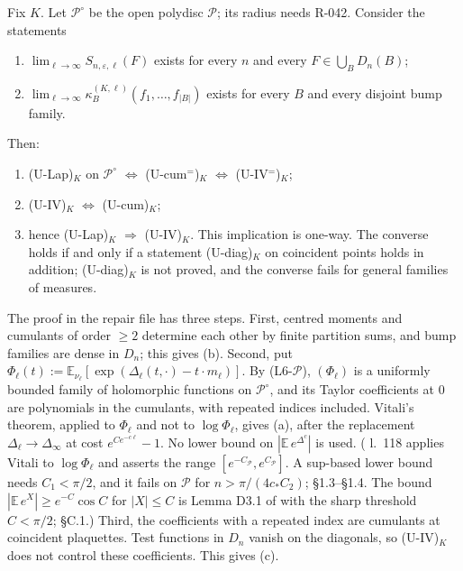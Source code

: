 \begin{theorem}\label{thm:open-U1}
Fix $K$. Let $\mathcal P^\circ$ be the open polydisc $\mathcal P$; its radius needs R-042. Consider the statements
\begin{enumerate}
\item[(U-IV)$_K$] $\lim_{\ell\to\infty}S_{n,\varepsilon,\ell}(F)$ exists for every $n$ and every $F\in\bigcup_BD_n(B)$;
\item[(U-cum)$_K$] $\lim_{\ell\to\infty}\kappa_B^{(K,\ell)}(f_1,\dots,f_{|B|})$ exists for every $B$ and every disjoint bump family.
\end{enumerate}
Then:
\begin{enumerate}
\item[(a)] (U-Lap)$_K$ on $\mathcal P^\circ$ $\Leftrightarrow$ (U-cum$^=$)$_K$ $\Leftrightarrow$ (U-IV$^=$)$_K$;
\item[(b)] (U-IV)$_K$ $\Leftrightarrow$ (U-cum)$_K$;
\item[(c)] hence (U-Lap)$_K$ $\Rightarrow$ (U-IV)$_K$. This implication is one-way. The converse holds if and only if a statement (U-diag)$_K$ on coincident points holds in addition; (U-diag)$_K$ is not proved, and the converse fails for general families of measures.
\end{enumerate}
\end{theorem}

The proof in the repair file has three steps. First, centred moments and cumulants of order $\ge2$ determine each other by finite partition sums, and bump families are dense in $D_n$; this gives (b). Second, put $\Phi_\ell(t):=\mathbb E_{\nu_\ell}[\exp(\Delta_\ell(t,\cdot)-t\cdot m_\ell)]$. By (L6-$\mathcal P$), $(\Phi_\ell)$ is a uniformly bounded family of holomorphic functions on $\mathcal P^\circ$, and its Taylor coefficients at $0$ are polynomials in the cumulants, with repeated indices included. Vitali's theorem, applied to $\Phi_\ell$ and not to $\log\Phi_\ell$, gives (a), after the replacement $\Delta_\ell\to\Delta_\infty$ at cost $e^{Ce^{-c\ell}}-1$. No lower bound on $|\mathbb E\,e^{\Delta^c}|$ is used. ( l.~118 applies Vitali to $\log\Phi_\ell$ and asserts the range $[e^{-C_{\mathcal P}},e^{C_{\mathcal P}}]$. A sup-based lower bound needs $C_1<\pi/2$, and it fails on $\mathcal P$ for $n>\pi/(4c_*C_2)$;  \S1.3--\S1.4. The bound $|\mathbb E\,e^X|\ge e^{-C}\cos C$ for $|X|\le C$ is Lemma D3.1 of  with the sharp threshold $C<\pi/2$;  \S C.1.) Third, the coefficients with a repeated index are cumulants at coincident plaquettes. Test functions in $D_n$ vanish on the diagonals, so (U-IV)$_K$ does not control these coefficients. This gives (c).

